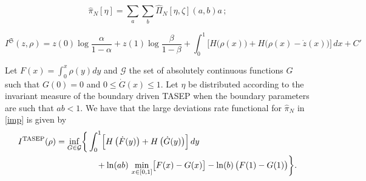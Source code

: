 \documentclass[10pt,a4paper]{amsart}
\renewcommand{\hat}{\widehat}
\begin{document}
	\begin{equation}\label{imp}
		\hat \pi_N[\eta]=\sum_{a}\sum_{ b}\hat \Pi_N[\eta,\zeta]\left(a, b\right)a\,;
	\end{equation}

		\begin{equation}\label{rhoezeta}
			I^{\mathfrak S}(z,\rho)=z(0)\log\frac{\alpha}{1-\alpha}+z(1)\log\frac{\beta}{1-\beta}+\int_0^1 \Big[H\big(\rho(x)\big)+H\Big(\rho(x)-\dot{z}(x)\Big)\Big] \, dx +  C'
		\end{equation}

	\begin{theorem}
		Let $F(x)=\int_0^x\rho(y)dy$ and $\mathcal G$ the set of absolutely continuous functions $G$ such that $G(0)=0$ and $0\leq \dot G(x)\leq 1$. Let $\eta$ be distributed according to the invariant measure of the boundary driven TASEP when the boundary parameters are such that $ab<1$. We have that the large deviations rate functional for $\hat\pi_N$ in \eqref{imp} is given by
		\begin{equation*}
			\begin{aligned}
				I^{\mathrm{TASEP}}(\rho)
				= \inf_{G\in \mathcal G} \biggl\{
				&\int_0^1 \Bigl[H\left(\dot F(y)\right) + H\left(\dot{G}(y)\right)\Bigr]\, dy  \\
				&\quad + \ln(ab)\, \min_{x\in[0,1]} \bigl[F(x)-G(x)\bigr] - \ln(b)\, \bigl(F(1)-G(1)\bigr)
				\biggr\}.
			\end{aligned}
		\end{equation*}
	\end{theorem}
\end{document}
